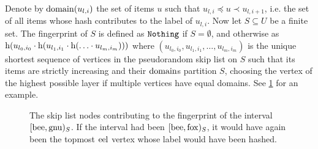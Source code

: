 Denote by $\operatorname{domain}(u_{l, i})$ the set of items $u$ such that $u_{l, i} \preceq u \prec u_{l, i + 1}$, i.e. the set of all items whose hash contributes to the label of $u_{l, i}$. Now let $S \subseteq U$ be a finite set. The fingerprint of $S$ is defined as $\mathtt{Nothing}$ if $S = \emptyset$, and otherwise as $\operatorname{h}(u_{l_0, i_0} \cdot \operatorname{h}(u_{l_1, i_1} \cdot \operatorname{h}(\ldots \cdot u_{l_m, i_m})))$ where $(u_{l_0, i_0}, u_{l_1, i_1}, \ldots, u_{l_m, i_m})$ is the unique shortest sequence of vertices in the pseudorandom skip list on $S$ such that its items are strictly increasing and their $\operatorname{domain}$s partition $S$, choosing the vertex of the highest possible layer if multiple vertices have equal domains. See \cref{fig:skip-list-fingerprint} for an example.

\begin{figure*}
\begin{scaletikzpicturetowidth}{\textwidth}
\end{scaletikzpicturetowidth}

\caption{
The skip list nodes contributing to the fingerprint of the interval $[{\mathrm{bee}},{\mathrm{gnu}})_{S}$. If the interval had been $[{\mathrm{bee}},{\mathrm{fox}})_{S}$, it would have again been the topmost $\mathrm{eel}$ vertex whose label would have been hashed.
}

\label{fig:skip-list-fingerprint}
\end{figure*}

